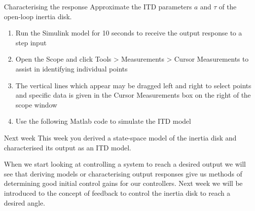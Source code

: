 \documentclass[9pt]{beamer-control}
\begin{document}
\begin{frame}{Characterising the response}
	Approximate the ITD parameters $a$ and $\tau$ of the open-loop inertia disk.
	\begin{enumerate}
		\item Run the Simulink model for 10 seconds to receive the output response to a step input
		\item Open the Scope and click Tools > Measurements > Cursor Measurements to assist in identifying individual points
		\item The vertical lines which appear may be dragged left and right to select points and specific data is given in the Cursor Measurements box on the right of the scope window
		\item Use the following Matlab code to simulate the ITD model
		\end{enumerate}
\end{frame}


\begin{frame}{Next week}
	This week you derived a state-space model of the inertia disk and characterised its output as an ITD model.
		
	When we start looking at controlling a system to reach a desired output we will see that deriving models or characterising output responses give us methods of determining good initial control gains for our controllers. Next week we will be introduced to the concept of feedback to control the inertia disk to reach a desired angle. 
\end{frame}
\end{document}
